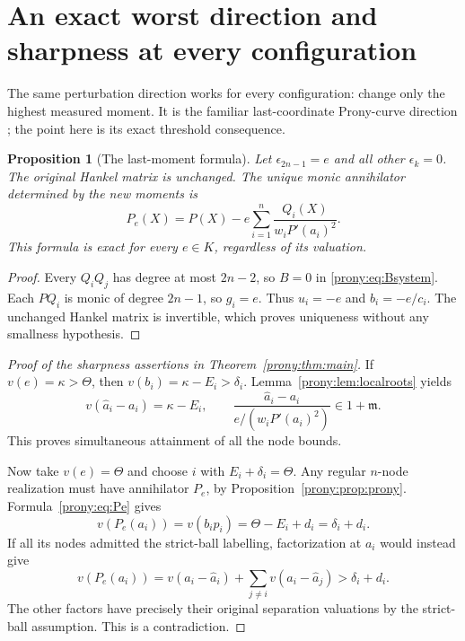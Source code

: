 \documentclass[11pt,letterpaper]{article}
\newtheorem{proposition}[theorem]{Proposition}
\theoremstyle{definition}
\theoremstyle{remark}
\newcommand{\mfr}{\mathfrak m}
\newcommand{\ah}{\widehat a}
\begin{document}
\section{An exact worst direction and sharpness at every configuration}
\label{prony:sec:sharp}

The same perturbation direction works for every configuration: change only
the highest measured moment.
It is the familiar last-coordinate Prony-curve direction \cite{AGY}; the
point here is its exact threshold consequence.

\begin{proposition}[The last-moment formula]\label{prony:prop:last}
Let $\epsilon_{2n-1}=e$ and all other $\epsilon_k=0$. The original Hankel
matrix is unchanged. The unique monic annihilator determined by the new
moments is
\begin{equation}\label{prony:eq:Pe}
 P_e(X)=P(X)-e\sum_{i=1}^n\frac{Q_i(X)}{w_iP'(a_i)^2}.
\end{equation}
This formula is exact for every $e\in K$, regardless of its valuation.
\end{proposition}
\begin{proof}
Every $Q_iQ_j$ has degree at most $2n-2$, so $B=0$ in
\eqref{prony:eq:Bsystem}. Each $PQ_i$ is monic of degree $2n-1$, so $g_i=e$.
Thus $u_i=-e$ and $b_i=-e/c_i$. The unchanged Hankel matrix is invertible,
which proves uniqueness without any smallness hypothesis.
\end{proof}

\begin{proof}[Proof of the sharpness assertions in Theorem~\ref{prony:thm:main}]
If $v(e)=\kappa>\Theta$, then $v(b_i)=\kappa-E_i>\delta_i$.
Lemma~\ref{prony:lem:localroots} yields
\begin{equation}\label{prony:eq:leadingnode}
 v(\ah_i-a_i)=\kappa-E_i,\qquad
 \frac{\ah_i-a_i}{e/(w_iP'(a_i)^2)}\in1+\mfr.
\end{equation}
This proves simultaneous attainment of all the node bounds.

Now take $v(e)=\Theta$ and choose $i$ with $E_i+\delta_i=\Theta$.
Any regular $n$-node realization must have annihilator $P_e$, by
Proposition~\ref{prony:prop:prony}. Formula~\eqref{prony:eq:Pe} gives
\[
 v(P_e(a_i))=v(b_i p_i)=\Theta-E_i+d_i=\delta_i+d_i.
\]
If all its nodes admitted the strict-ball labelling, factorization at $a_i$
would instead give
\[
 v(P_e(a_i))
 =v(a_i-\ah_i)+\sum_{j\ne i}v(a_i-\ah_j)>\delta_i+d_i.
\]
The other factors have precisely their original separation valuations by
the strict-ball assumption. This is a contradiction.
\end{proof}
\end{document}
